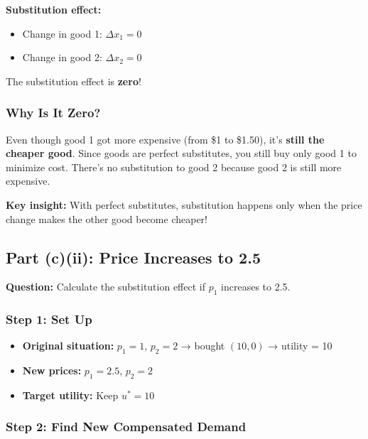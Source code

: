 \documentclass[11pt]{article}
\begin{document}
\begin{tcolorbox}[colback=yellow!10!white,colframe=orange!75!black,title=Answer to Part (c)(i)]
\textbf{Substitution effect:}
\begin{itemize}
\item Change in good 1: $\Delta x_1 = 0$
\item Change in good 2: $\Delta x_2 = 0$
\end{itemize}

The substitution effect is \textbf{zero}!
\end{tcolorbox}

\subsubsection{Why Is It Zero?}

Even though good 1 got more expensive (from \$1 to \$1.50), it's \textbf{still the cheaper good}. Since goods are perfect substitutes, you still buy only good 1 to minimize cost. There's no substitution to good 2 because good 2 is still more expensive.

\textbf{Key insight:} With perfect substitutes, substitution happens only when the price change makes the other good become cheaper!

\subsection{Part (c)(ii): Price Increases to 2.5}

\textbf{Question:} Calculate the substitution effect if $p_1$ increases to 2.5.

\subsubsection{Step 1: Set Up}

\begin{itemize}
\item \textbf{Original situation:} $p_1 = 1$, $p_2 = 2$ → bought $(10, 0)$ → utility = 10
\item \textbf{New prices:} $p_1 = 2.5$, $p_2 = 2$
\item \textbf{Target utility:} Keep $u^* = 10$
\end{itemize}

\subsubsection{Step 2: Find New Compensated Demand}
\end{document}
